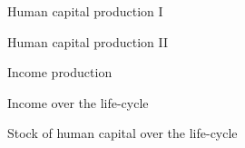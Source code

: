 \begin{frame}\begin{figure}[htp]\centering
\caption{Human capital production I}\label{Human capital production I}
\end{figure}\end{frame}

\begin{frame}\begin{figure}[htp]\centering
\caption{Human capital production II}\label{Human capital production II}
\end{figure}\end{frame}

\begin{frame}\begin{figure}[htp]\centering
\caption{Income production}\label{Income production}
\end{figure}\end{frame}

\begin{frame}\begin{figure}[htp]\centering
\caption{Income over the life-cycle}\label{Income over the life-cycle}
\end{figure}\end{frame}

\begin{frame}\begin{figure}[htp]\centering
\caption{Stock of human capital over the life-cycle}
\label{Stock of human capital over the life-cycle}
\end{figure}\end{frame}

